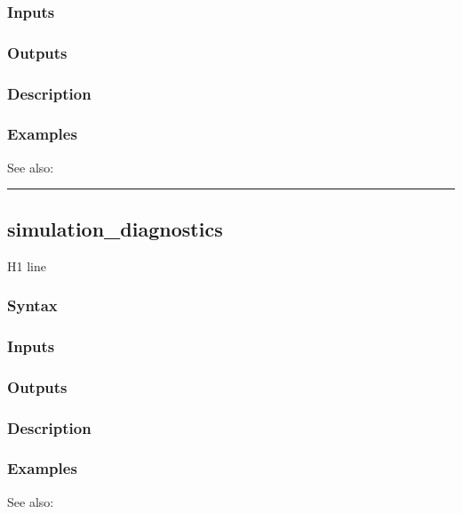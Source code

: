 \documentclass[letterpaper,10pt,english]{sphinxmanual}
\begin{document}
\subsubsection{Inputs}
\label{classes/models/@dsge/dsge:id171}

\subsubsection{Outputs}
\label{classes/models/@dsge/dsge:id172}

\subsubsection{Description}
\label{classes/models/@dsge/dsge:id173}

\subsubsection{Examples}
\label{classes/models/@dsge/dsge:id174}
See also:


\bigskip\hrule{}\bigskip



\subsection{simulation\_diagnostics}
\label{classes/models/@dsge/dsge:id175}\label{classes/models/@dsge/dsge:simulation-diagnostics}
H1 line


\subsubsection{Syntax}
\label{classes/models/@dsge/dsge:id176}

\subsubsection{Inputs}
\label{classes/models/@dsge/dsge:id177}

\subsubsection{Outputs}
\label{classes/models/@dsge/dsge:id178}

\subsubsection{Description}
\label{classes/models/@dsge/dsge:id179}

\subsubsection{Examples}
\label{classes/models/@dsge/dsge:id180}
See also:
\end{document}
